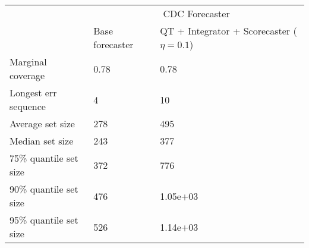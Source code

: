 \begin{tabular}{lll}
\toprule
& \multicolumn{2}{c}{CDC Forecaster} \\
& Base forecaster & QT + Integrator + Scorecaster ($\eta=0.1$) \\
\midrule
Marginal coverage & 0.78 & 0.78 \\
Longest err sequence & 4 & 10 \\
Average set size & 278 & 495 \\
Median set size & 243 & 377 \\
75\% quantile set size & 372 & 776 \\
90\% quantile set size & 476 & 1.05e+03 \\
95\% quantile set size & 526 & 1.14e+03 \\
\bottomrule
\end{tabular}
